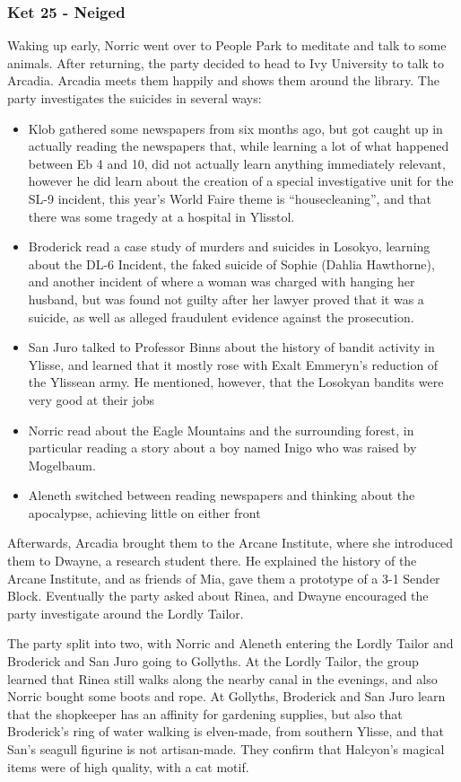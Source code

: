 \subsubsection{Ket 25 - Neiged}
Waking up early, Norric went over to People Park to meditate and talk to some animals. After returning, the party decided to head to Ivy University to talk to Arcadia. Arcadia meets them happily and shows them around the library. The party investigates the suicides in several ways:
\begin{itemize}
\item Klob gathered some newspapers from six months ago, but got caught up in actually reading the newspapers that, while learning a lot of what happened between Eb 4 and 10, did not actually learn anything immediately relevant, however he did learn about the creation of a special investigative unit for the SL-9 incident, this year's World Faire theme is ``housecleaning'', and that there was some tragedy at a hospital in Ylisstol.
\item Broderick read a case study of murders and suicides in Losokyo, learning about the DL-6 Incident, the faked suicide of Sophie (Dahlia Hawthorne), and another incident of where a woman was charged with hanging her husband, but was found not guilty after her lawyer proved that it was a suicide, as well as alleged fraudulent evidence against the prosecution.
\item San Juro talked to Professor Binns about the history of bandit activity in Ylisse, and learned that it mostly rose with Exalt Emmeryn's reduction of the Ylissean army. He mentioned, however, that the Losokyan bandits were very good at their jobs
\item Norric read about the Eagle Mountains and the surrounding forest, in particular reading a story about a boy named Inigo who was raised by Mogelbaum.
\item Aleneth switched between reading newspapers and thinking about the apocalypse, achieving little on either front
\end{itemize}
Afterwards, Arcadia brought them to the Arcane Institute, where she introduced them to Dwayne, a research student there. He explained the history of the Arcane Institute, and as friends of Mia, gave them a prototype of a 3-1 Sender Block. Eventually the party asked about Rinea, and Dwayne encouraged the party investigate around the Lordly Tailor.

The party split into two, with Norric and Aleneth entering the Lordly Tailor and Broderick and San Juro going to Gollyths. At the Lordly Tailor, the group learned that Rinea still walks along the nearby canal in the evenings, and also Norric bought some boots and rope. At Gollyths, Broderick and San Juro learn that the shopkeeper has an affinity for gardening supplies, but also that Broderick's ring of water walking is elven-made, from southern Ylisse, and that San's seagull figurine is not artisan-made. They confirm that Halcyon's magical items were of high quality, with a cat motif. 


